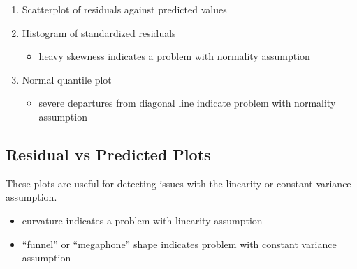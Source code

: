 \documentclass[]{book}
\providecommand{\tightlist}{%
  \setlength{\itemsep}{0pt}\setlength{\parskip}{0pt}}
\begin{document}
\begin{enumerate}
\def\labelenumi{\arabic{enumi}.}
\item
  Scatterplot of residuals against predicted values
\item
  Histogram of standardized residuals

  \begin{itemize}
  \tightlist
  \item
    heavy skewness indicates a problem with normality assumption
  \end{itemize}
\item
  Normal quantile plot

  \begin{itemize}
  \tightlist
  \item
    severe departures from diagonal line indicate problem with normality
    assumption
  \end{itemize}
\end{enumerate}

\subsection{Residual vs Predicted
Plots}\label{residual-vs-predicted-plots}

These plots are useful for detecting issues with the linearity or
constant variance assumption.

\begin{itemize}
\tightlist
\item
  curvature indicates a problem with linearity assumption\\
\item
  ``funnel'' or ``megaphone'' shape indicates problem with constant
  variance assumption
\end{itemize}
\end{document}

